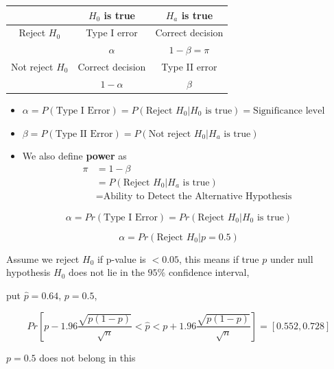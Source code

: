 \documentclass{beamer}\usepackage[]{graphicx}\usepackage[]{color}
\begin{document}
\begin{frame}

\begin{tabular}{ c | c  | c }
& $H_0$ is true & $H_a$ is true\\
\hline
Reject $H_0$ & Type I error & Correct decision \\
& $\alpha$ & $1 - \beta = \pi$ \\
\hline
Not reject $H_0$ & Correct decision & Type II error \\
& $1-\alpha$ & $\beta$ \\
\end{tabular}

\begin{itemize}
\item $\alpha = P(\text{Type I Error}) = P(\text{Reject } H_0|H_0 \text{ is true}) = \text{Significance level} $
\item $\beta = P(\text{Type II Error}) = P(\text{Not reject } H_0|H_a \text{ is true})$
\vspace{5mm}
\item We also define \textbf{power} as
\begin{align*}
\pi &= 1 - \beta \\
&= P(\text{Reject } H_0|H_a \text{ is true}) \\
&= \text{Ability to Detect the Alternative Hypothesis}
\end{align*}
\end{itemize}

\end{frame}

\begin{frame}

$$ \alpha = Pr (\text{Type I Error}) = Pr (\text{Reject } H_0|H_0 \text{ is true}) $$

$$ \alpha = Pr (\text{Reject } H_0|p=0.5) $$

Assume we reject $H_0$ if p-value is $< 0.05$, this means if true $p$  under null hypothesis $H_0$ does not lie in the $95 \%$ confidence interval,

put $\hat{p}=0.64$, $p=0.5$,

$$ Pr \left[ p - 1.96 \frac{\sqrt{p(1-p)}}{\sqrt{n}} < \hat{p} < p + 1.96 \frac{\sqrt{p(1-p)}}{\sqrt{n}} \right] = [0.552, 0.728] $$

$p=0.5$ does not belong in this

\end{frame}
\end{document}
